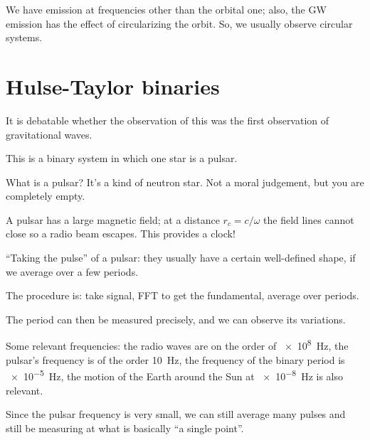 \documentclass[main.tex]{subfiles}
\begin{document}
We have emission at frequencies other than the orbital one; also, the GW emission has the effect of circularizing the orbit. 
So, we usually observe circular systems. 

\section{Hulse-Taylor binaries}

It is debatable whether the observation of this was the first observation of gravitational waves. 

This is a binary system in which one star is a pulsar. 

What is a pulsar? It's a kind of neutron star.
Not a moral judgement, but you are completely empty.

A pulsar has a large magnetic field; at a distance \(r_c = c/\omega \) the field lines cannot close so a radio beam escapes. 
This provides a clock!

``Taking the pulse'' of a pulsar: they usually have a certain well-defined shape, if we average over a few periods. 

The procedure is: take signal, FFT to get the fundamental, average over periods. 

The period can then be measured precisely, and we can observe its variations. 

Some relevant frequencies: the radio waves are on the order of \SI{e8}{Hz}, the pulsar's frequency is of the order \SI{10}{Hz}, the frequency of the binary period is \SI{e-5}{Hz}, the motion of the Earth around the Sun at \SI{e-8}{Hz} is also relevant. 

Since the pulsar frequency is very small, we can still average many pulses and still be measuring at what is basically ``a single point''. 
\end{document}
